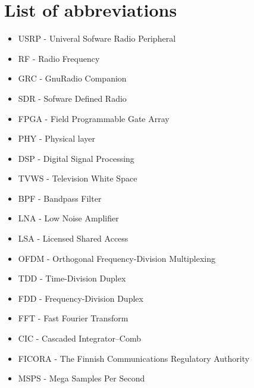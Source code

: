 \section*{List of abbreviations}



\begin{itemize}
\tightlist
\item
  USRP - Univeral Sofware Radio Peripheral
\item
  RF - Radio Frequency
\item
  GRC - GnuRadio Companion
\item
  SDR - Sofware Defined Radio
\item
  FPGA - Field Programmable Gate Array
\item
  PHY - Physical layer
\item
  DSP - Digital Signal Processing
\item
  TVWS - Television White Space
\item
  BPF - Bandpass Filter
\item
  LNA - Low Noise Amplifier
\item
  LSA - Licensed Shared Access
\item
  OFDM - Orthogonal Frequency-Division Multiplexing
\item
  TDD - Time-Division Duplex
\item
  FDD - Frequency-Division Duplex
\item
  FFT - Fast Fourier Transform
\item
  CIC - Cascaded Integrator–Comb
\item
  FICORA - The Finnish Communications Regulatory Authority
\item
  MSPS - Mega Samples Per Second
\end{itemize}
